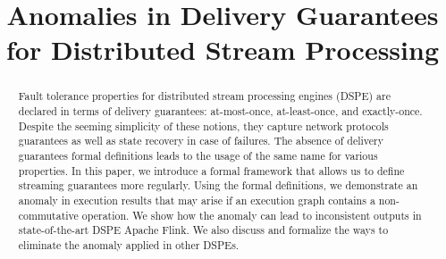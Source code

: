 \documentclass[sigconf]{acmart}
\theoremstyle{remark}
\begin{document}

    \title {Anomalies in Delivery Guarantees for Distributed Stream Processing}








    \begin{abstract}
        Fault tolerance properties for distributed stream processing engines (DSPE) are declared in terms of delivery guarantees: at-most-once, at-least-once, and exactly-once.
        Despite the seeming simplicity of these notions, they capture network protocols guarantees as well as state recovery in case of failures.
        The absence of delivery guarantees formal definitions leads to the usage of the same name for various properties.
        In this paper, we introduce a formal framework that allows us to define streaming guarantees more regularly.
        Using the formal definitions, we demonstrate an anomaly in execution results that may arise if an execution graph contains a non-commutative operation.
        We show how the anomaly can lead to inconsistent outputs in state-of-the-art DSPE Apache Flink.
        We also discuss and formalize the ways to eliminate the anomaly applied in other DSPEs.
    \end{abstract}
\end{document}
